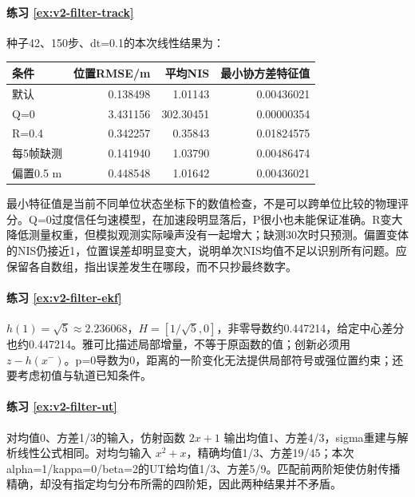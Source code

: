 \paragraph*{练习 \ref{ex:v2-filter-track}}
\begin{solution}
种子42、150步、dt=0.1的本次线性结果为：
\begin{center}
\begin{tabular}{lrrr}
\toprule
条件 & 位置RMSE/m & 平均NIS & 最小协方差特征值\\
\midrule
默认 & 0.138498 & 1.01143 & 0.00436021\\
Q=0 & 3.431156 & 302.30451 & 0.00000354\\
R=0.4 & 0.342257 & 0.35843 & 0.01824575\\
每5帧缺测 & 0.141940 & 1.03790 & 0.00486474\\
偏置0.5 m & 0.448548 & 1.01642 & 0.00436021\\
\bottomrule
\end{tabular}
\end{center}
最小特征值是当前不同单位状态坐标下的数值检查，不是可以跨单位比较的物理评分。Q=0过度信任匀速模型，在加速段明显落后，P很小也未能保证准确。R变大降低测量权重，但模拟观测实际噪声没有一起增大；缺测30次时只预测。偏置变体的NIS仍接近1，位置误差却明显变大，说明单次NIS均值不足以识别所有问题。应保留各自数组，指出误差发生在哪段，而不只抄最终数字。
\end{solution}

\paragraph*{练习 \ref{ex:v2-filter-ekf}}
\begin{solution}
$h(1)=\sqrt5\approx2.236068$，$H=[1/\sqrt5,0]$，非零导数约0.447214，给定中心差分也约0.447214。雅可比描述局部增量，不等于原函数的值；创新必须用 $z-h(x^-)$。p=0导数为0，距离的一阶变化无法提供局部符号或强位置约束；还要考虑初值与轨道已知条件。
\end{solution}

\paragraph*{练习 \ref{ex:v2-filter-ut}}
\begin{solution}
对均值0、方差1/3的输入，仿射函数 $2x+1$ 输出均值1、方差4/3，sigma重建与解析线性公式相同。对均匀输入 $x^2+x$，精确均值1/3、方差19/45；本次alpha=1/kappa=0/beta=2的UT给均值1/3、方差5/9。匹配前两阶矩使仿射传播精确，却没有指定均匀分布所需的四阶矩，因此两种结果并不矛盾。
\end{solution}

